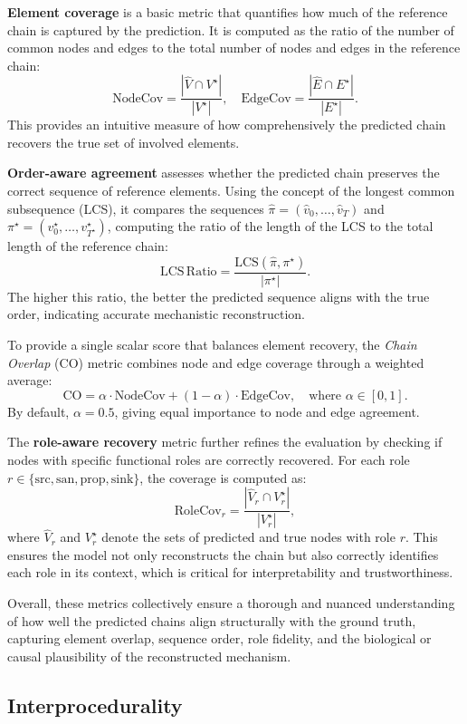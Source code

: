\documentclass{buthesis}
\begin{document}
\textbf{Element coverage} is a basic metric that quantifies how much of the reference chain is captured by the prediction. It is computed as the ratio of the number of common nodes and edges to the total number of nodes and edges in the reference chain:
\[
\mathrm{NodeCov} = \frac{|\hat{V} \cap V^\star|}{|V^\star|}, \quad
\mathrm{EdgeCov} = \frac{|\hat{E} \cap E^\star|}{|E^\star|}.
\]
This provides an intuitive measure of how comprehensively the predicted chain recovers the true set of involved elements.

\textbf{Order-aware agreement} assesses whether the predicted chain preserves the correct sequence of reference elements. Using the concept of the longest common subsequence (LCS), it compares the sequences \(\hat{\pi} = (\hat{v}_0, \ldots, \hat{v}_T)\) and \(\pi^\star = (v^\star_0, \ldots, v^\star_{T^\star})\), computing the ratio of the length of the LCS to the total length of the reference chain:
\[
\mathrm{LCS\, Ratio} = \frac{\mathrm{LCS}(\hat{\pi}, \pi^\star)}{|\pi^\star|}.
\]
The higher this ratio, the better the predicted sequence aligns with the true order, indicating accurate mechanistic reconstruction.

To provide a single scalar score that balances element recovery, the \emph{Chain Overlap} (CO) metric combines node and edge coverage through a weighted average:
\[
\mathrm{CO} = \alpha \cdot \mathrm{NodeCov} + (1 - \alpha) \cdot \mathrm{EdgeCov}, \quad \text{where } \alpha \in [0, 1].
\]
By default, \(\alpha=0.5\), giving equal importance to node and edge agreement.

The \textbf{role-aware recovery} metric further refines the evaluation by checking if nodes with specific functional roles are correctly recovered. For each role \(r \in \{\text{src}, \text{san}, \text{prop}, \text{sink}\}\), the coverage is computed as:
\[
\mathrm{RoleCov}_r = \frac{|\hat{V}_r \cap V^\star_r|}{|V^\star_r|},
\]
where \(\hat{V}_r\) and \(V^\star_r\) denote the sets of predicted and true nodes with role \(r\). This ensures the model not only reconstructs the chain but also correctly identifies each role in its context, which is critical for interpretability and trustworthiness.

Overall, these metrics collectively ensure a thorough and nuanced understanding of how well the predicted chains align structurally with the ground truth, capturing element overlap, sequence order, role fidelity, and the biological or causal plausibility of the reconstructed mechanism.

\subsection{Interprocedurality}
\label{subsec:ipa-gov}
\end{document}
